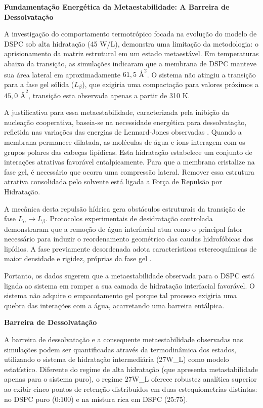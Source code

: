\vspace{1em}
\noindent\textbf{Fundamentação Energética da Metaestabilidade: A Barreira de Dessolvatação}

A investigação do comportamento termotrópico focada na evolução do modelo de DSPC sob alta hidratação (45 W/L), demonstra uma limitação da metodologia: o aprisionamento da matriz estrutural em um estado metaestável. Em temperaturas abaixo da transição, as simulações indicaram que a membrana de DSPC manteve sua área lateral em aproximadamente $61,5\text{ \AA}^2$. O sistema não atingiu a transição para a fase gel sólida ($L_\beta$), que exigiria uma compactação para valores próximos a $45,0\text{ \AA}^2$, transição esta observada apenas a partir de 310 K.

A justificativa para essa metaestabilidade, caracterizada pela inibição da nucleação cooperativa, baseia-se na necessidade energética para dessolvatação, refletida nas variações das energias de Lennard-Jones observadas \cite{kowalik2015}. Quando a membrana permanece dilatada, as moléculas de água e íons interagem com os grupos polares das cabeças lipídicas. Esta hidratação estabelece um conjunto de interações atrativas favorável entalpicamente. Para que a membrana cristalize na fase gel, é necessário que ocorra uma compressão lateral. Remover essa estrutura atrativa consolidada pelo solvente está ligada a Força de Repulsão por Hidratação.

A mecânica desta repulsão hídrica gera obstáculos estruturais da transição de fase $L_\alpha \rightarrow L_\beta$. Protocolos experimentais de desidratação controlada demonstraram que a remoção de água interfacial atua como o principal fator necessário para induzir o reordenamento geométrico das caudas hidrofóbicas dos lipídios. A fase previamente desordenada adota características estereoquímicas de maior densidade e rigidez, próprias da fase gel \cite{krok2024}.

Portanto, os dados sugerem que a metaestabilidade observada para o DSPC está ligada ao sistema em romper a sua camada de hidratação interfacial favorável. O sistema não adquire o empacotamento gel porque tal processo exigiria uma quebra das interações com a água, acarretando uma barreira entálpica.


\vspace{1em}
\noindent\textbf{Barreira de Dessolvatação}

A barreira de dessolvatação e a consequente metaestabilidade observadas nas simulações podem ser quantificadas através da termodinâmica dos estados, utilizando o sistema de hidratação intermediária (27W\_L) como modelo estatístico. Diferente do regime de alta hidratação (que apresenta metastabilidade apenas para o sistema puro), o regime 27W\_L oferece robustez analítica superior ao exibir cinco pontos de retenção distribuídos em duas estequiometrias distintas: no DSPC puro (0:100) e na mistura rica em DSPC (25:75).

